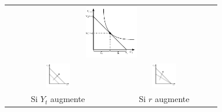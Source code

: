 \begin{center}
    \begin{tabular}{cc}
        \multicolumn{2}{c}{\includegraphics[width=0.25\textwidth]{images/graph_offre_de_capital.pdf}}\\
        \includegraphics[width=0.25\textwidth]{images/graph_offre_de_capital_y_t_augmente.pdf}&
        \includegraphics[width=0.25\textwidth]{images/graph_offre_de_capital_r_augmente.pdf}\\
        Si $Y_t$ augmente &
        Si $r$ augmente
    \end{tabular}
\end{center}